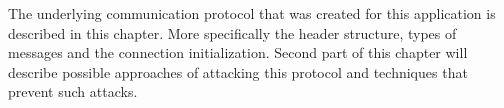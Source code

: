 The underlying communication protocol that was created for this application is described in this chapter. More specifically the header structure, types of messages and the connection initialization. Second part of this chapter will describe possible approaches of attacking this protocol and techniques that prevent such attacks.
